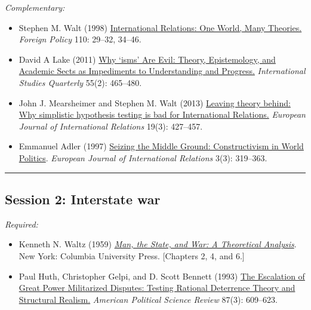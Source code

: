 \documentclass[12pt, a4paper]{article}
\begin{document}
\noindent\textit{Complementary:}

\begin{itemize}
  \item Stephen M. Walt (1998) \href{https://doi.org/10.2307/1149275}{International Relations: One World, Many Theories.} \textit{Foreign Policy} 110: 29--32, 34--46.
  \item David A Lake (2011) \href{https://doi.org/10.1111/j.1468-2478.2011.00661.x}{Why `isms' Are Evil: Theory, Epistemology, and Academic Sects as Impediments to Understanding and Progress.} \textit{International Studies Quarterly} 55(2): 465--480.
  \item John J. Mearsheimer and Stephen M. Walt (2013) \href{https://doi.org/10.1177/1354066113494320}{Leaving theory behind: Why simplistic hypothesis testing is bad for International Relations.} \textit{European Journal of International Relations} 19(3): 427--457.
  \item Emmanuel Adler (1997) \href{https://doi.org/10.1177/1354066197003003003}{Seizing the Middle Ground: Constructivism in World Politics}. \textit{European Journal of International Relations} 3(3): 319--363.
\end{itemize}


\vspace{20pt}
\hrule
\subsection*{Session 2: Interstate war}

\noindent\textit{Required:}

\begin{itemize}
  \item Kenneth N. Waltz (1959) \href{https://cup.columbia.edu/book/man-the-state-and-war/9780231188043}{\textit{Man, the State, and War: A Theoretical Analysis}}. New York: Columbia University Press. [Chapters 2, 4, and 6.]
  \item Paul Huth, Christopher Gelpi, and D. Scott Bennett (1993) \href{https://doi.org/10.2307/2938739}{The Escalation of Great Power Militarized Disputes: Testing Rational Deterrence Theory and Structural Realism.} \textit{American Political Science Review} 87(3): 609--623.
\end{itemize}
\end{document}
